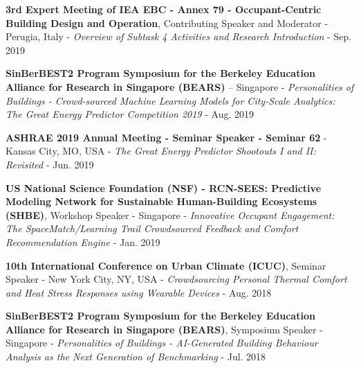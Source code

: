 \documentclass[10pt,a4paper]{article}
\begin{document}
\begin{small}
\begin{etaremune}
\item
\textbf{3rd Expert Meeting of IEA EBC - Annex 79 - Occupant-Centric Building Design and Operation}, Contributing Speaker and Moderator - Perugia, Italy - \emph{Overview of Subtask 4 Activities and Research Introduction}  - Sep. 2019
\item
\textbf{SinBerBEST2 Program Symposium for the Berkeley Education Alliance for Research in Singapore (BEARS)} – Singapore - \emph{Personalities of Buildings - Crowd-sourced Machine Learning Models for City-Scale Analytics: The Great Energy Predictor Competition 2019} - Aug. 2019
\item
\textbf{ASHRAE 2019 Annual Meeting - Seminar Speaker - Seminar 62} - Kansas City, MO, USA - \emph{The Great Energy Predictor Shootouts I and II: Revisited} - Jun. 2019 
\item
\textbf{US National Science Foundation (NSF) -  RCN-SEES: Predictive Modeling Network for Sustainable Human-Building Ecosystems (SHBE)}, Workshop Speaker - Singapore - \emph{Innovative Occupant Engagement: The SpaceMatch/Learning Trail Crowdsourced Feedback and Comfort Recommendation Engine} - Jan. 2019
\item
\textbf{10th International Conference on Urban Climate (ICUC)}, Seminar Speaker - New York City, NY, USA - \emph{Crowdsourcing Personal Thermal Comfort and Heat Stress Responses using Wearable Devices} -  Aug. 2018
\item
\textbf{SinBerBEST2 Program Symposium for the Berkeley Education Alliance for Research in Singapore (BEARS)}, Symposium Speaker - Singapore - \emph{Personalities of Buildings - AI-Generated Building Behaviour Analysis as the Next Generation of Benchmarking} - Jul. 2018
\end{etaremune}



\end{small}
\end{document}
